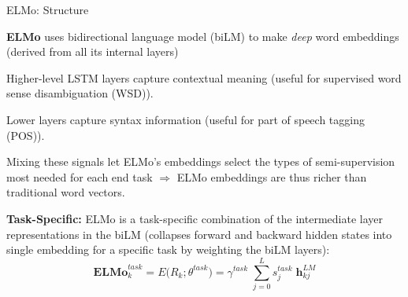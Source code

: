 \begin{frame}{ELMo: Structure}

    \begin{itemizeSpaced}{2pt}
        \pinkbox \textbf{ELMo} uses bidirectional language model (biLM) to make \emph{deep} word embeddings (derived from all its internal layers)

        \pinkbox Higher-level LSTM layers capture contextual meaning (useful for supervised word sense disambiguation (WSD)).
        
        \pinkbox Lower layers capture syntax information (useful for part of speech tagging (POS)). 
        
        \pinkbox Mixing these signals let ELMo's embeddings select the types of semi-supervision most needed for each end task $\Rightarrow$ ELMo embeddings are thus richer than traditional word vectors. 
        
        \item \textbf{Task-Specific: } ELMo is a task-specific combination of the intermediate layer representations in the biLM (collapses forward and backward hidden states into single embedding for a specific task by weighting the biLM layers): \footnotemark 
        $$
        \textbf{ELMo}_k^{task} = E \Big( R_k; \theta^{task} \Big) = \gamma^{task} \; \sum_{j=0}^L s_j^{task} \; \mathbf{h}_{kj}^{LM}
        $$ 
        
        
    \end{itemizeSpaced}
    
    
    
\end{frame}



